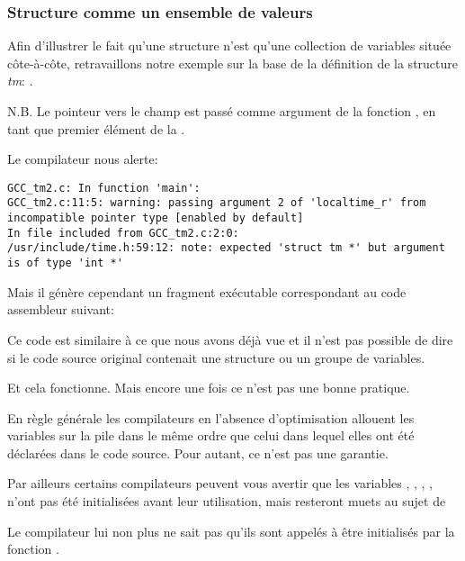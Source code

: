 ﻿\subsubsection{Structure comme un ensemble de valeurs}

Afin d'illustrer le fait qu'une structure n'est qu'une collection de variables située côte-à-côte, 
retravaillons notre exemple sur la base de la définition de la structure \emph{tm}: .



N.B. Le pointeur vers le champ  est passé comme argument de la fonction 
, en tant que premier élément de la .

Le compilateur nous alerte:

\begin{lstlisting}[caption=GCC 4.7.3]
GCC_tm2.c: In function 'main':
GCC_tm2.c:11:5: warning: passing argument 2 of 'localtime_r' from incompatible pointer type [enabled by default]
In file included from GCC_tm2.c:2:0:
/usr/include/time.h:59:12: note: expected 'struct tm *' but argument is of type 'int *'
\end{lstlisting}

Mais il génère cependant un fragment exécutable correspondant au code assembleur suivant:



Ce code est similaire à ce que nous avons déjà vue et il n'est pas possible de dire si le code 
source original contenait une structure ou un groupe de variables.

Et cela fonctionne. Mais encore une fois ce n'est pas une bonne pratique. 

En règle générale les compilateurs en l'absence d'optimisation allouent les variables sur la pile 
dans le même ordre que celui dans lequel elles ont été déclarées dans le code source. Pour autant, 
ce n'est pas une garantie.

Par ailleurs certains compilateurs peuvent vous avertir que les variables , 
, , ,  n'ont pas été initialisées avant leur 
utilisation, mais resteront muets au sujet de 

Le compilateur lui non plus ne sait pas qu'ils sont appelés à être initialisés par la fonction 
.

